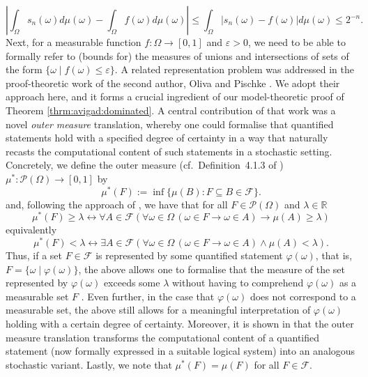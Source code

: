 \documentclass[11pt]{amsart}
\theoremstyle{definition}
\theoremstyle{remark}
\def\RR{\mathbb{R}}
\begin{document}
\[
\left|\int_{\Omega}s_n(\omega)d\mu(\omega)-\int_{\Omega}f(\omega)d\mu(\omega)\right| \le \int_{\Omega}\left|s_n(\omega)-f(\omega)\right|d\mu(\omega) \le 2^{-n}.
\]
Next, for a measurable function $f : \Omega \to [0,1]$ and $\varepsilon > 0$, we need to be able to formally refer to (bounds for) the measures of unions and intersections of sets of the form $\{\omega \mid f(\omega) \le \varepsilon\}$. A related representation problem was addressed in the proof-theoretic work of the second author, Oliva and Pischke \cite{NeriOlivaPischke2026}. We adopt their approach here, and it forms a crucial ingredient of our model-theoretic proof of Theorem \ref{thrm:avigad:dominated}. A central contribution of that work was a novel \emph{outer measure} translation, whereby one could formalise that quantified statements hold with a specified degree of certainty in a way that naturally recasts the computational content of such statements in a stochastic setting. Concretely, we define the outer measure (cf.\ Definition~4.1.3 of \cite{RR1983}) $\mu^* : \mathcal{P}(\Omega) \to [0,1]$ by
\[
  \mu^*(F) := \inf\{\mu(B) : F \subseteq B \in \mathcal{F}\}.
\]
 and, following the approach of \cite[Section 3] {NeriOlivaPischke2026}, we have that for all $F \in \mathcal{P}(\Omega)$ and $\lambda \in \RR$  
\[
\mu^*(F) \ge \lambda \leftrightarrow \forall A\in \mathcal{F} (\forall \omega \in \Omega\,(\omega \in F \to \omega \in A) \to \mu(A) \ge \lambda)
\]
equivalently 
\[
\mu^*(F) < \lambda \leftrightarrow \exists A\in \mathcal{F} (\forall \omega \in \Omega\,(\omega \in F \to \omega \in A) \land \mu(A)<  \lambda).
\]
Thus, if a set $F \in \mathcal{F}$ is represented by some quantified statement $\varphi(\omega)$, that is, $F = \{\omega \mid \varphi(\omega)\}$, the above allows one to formalise that the measure of the set represented by $\varphi(\omega)$ exceeds some $\lambda$ without having to comprehend $\varphi(\omega)$ as a measurable set $F$ \cite[Section~3]{NeriOlivaPischke2026}. Even further, in the case that $\varphi(\omega)$ does not correspond to a measurable set, the above still allows for a meaningful interpretation of $\varphi(\omega)$ holding with a certain degree of certainty. Moreover, it is shown in \cite[Section 5]{NeriOlivaPischke2026} that the outer measure translation transforms the computational content of a quantified statement (now formally expressed in a suitable logical system) into an analogous stochastic variant. Lastly, we note that $\mu^*(F) = \mu(F)$ for all $F \in \mathcal{F}$.
\end{document}
